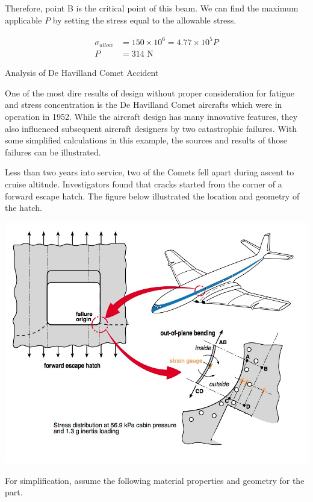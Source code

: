 \documentclass[a4paper,openany,nobib]{tufte-book}
\begin{document}
Therefore, point B is the critical point of this beam. We can find the
maximum applicable \(P\) by setting the stress equal to the allowable
stress.

$$\begin{aligned}
    \sigma_{allow} &= 150 \times 10^6 = 4.77 \times 10^5 P \\
    P &= 314 \text{ N}
  \end{aligned}$$

Analysis of De Havilland Comet Accident

One of the most dire results of design without proper consideration for
fatigue and stress concentration is the De Havilland Comet aircrafts
which were in operation in 1952. While the aircraft design has many
innovative features, they also influenced subsequent aircraft designers
by two catastrophic failures. With some simplified calculations in this
example, the sources and results of those failures can be illustrated.

Less than two years into service, two of the Comets fell apart during
ascent to cruise altitude. Investigators found that cracks started from
the corner of a forward escape hatch. The figure below illustrated the
location and geometry of the hatch.


\begin{center}
\includegraphics[width=.9\linewidth]{pictures/Static-body-load-analysis/de-havilland-analysis.jpg}
\end{center}

For simplification, assume the following material properties and
geometry for the part.
\end{document}
